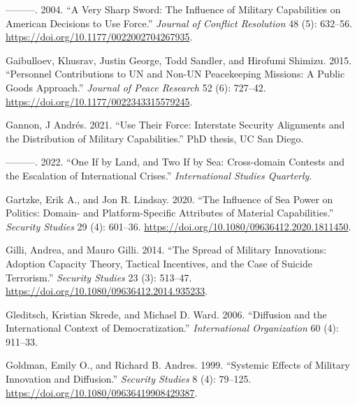\documentclass[
]{article}
\newlength{\cslhangindent}
\newlength{\cslentryspacingunit} %
\newenvironment{CSLReferences}[2] %
 {%
  \setlength{\parindent}{0pt}
  \ifodd #1
  \let\oldpar\par
  \def\par{\hangindent=\cslhangindent\oldpar}
  \fi
  \setlength{\parskip}{#2\cslentryspacingunit}
 }%
 {}
\begin{document}
\begin{CSLReferences}{1}{0}
\leavevmode{}%
---------. 2004. {``A {Very Sharp Sword}: {The Influence} of {Military Capabilities} on {American Decisions} to {Use Force}.''} \emph{Journal of Conflict Resolution} 48 (5): 632--56. \url{https://doi.org/10.1177/0022002704267935}.

\leavevmode{}%
Gaibulloev, Khusrav, Justin George, Todd Sandler, and Hirofumi Shimizu. 2015. {``Personnel Contributions to {UN} and Non-{UN} Peacekeeping Missions: {A} Public Goods Approach.''} \emph{Journal of Peace Research} 52 (6): 727--42. \url{https://doi.org/10.1177/0022343315579245}.

\leavevmode{}%
Gannon, J Andrés. 2021. {``Use {Their Force}: {Interstate Security Alignments} and the {Distribution} of {Military Capabilities}.''} PhD thesis, UC San Diego.

\leavevmode{}%
---------. 2022. {``One If by Land, and Two If by Sea: {Cross-domain} Contests and the Escalation of International Crises.''} \emph{International Studies Quarterly}.

\leavevmode{}%
Gartzke, Erik A., and Jon R. Lindsay. 2020. {``The {Influence} of {Sea Power} on {Politics}: {Domain-} and {Platform-Specific Attributes} of {Material Capabilities}.''} \emph{Security Studies} 29 (4): 601--36. \url{https://doi.org/10.1080/09636412.2020.1811450}.

\leavevmode{}%
Gilli, Andrea, and Mauro Gilli. 2014. {``The {Spread} of {Military Innovations}: {Adoption Capacity Theory}, {Tactical Incentives}, and the {Case} of {Suicide Terrorism}.''} \emph{Security Studies} 23 (3): 513--47. \url{https://doi.org/10.1080/09636412.2014.935233}.

\leavevmode{}%
Gleditsch, Kristian Skrede, and Michael D. Ward. 2006. {``Diffusion and the {International Context} of {Democratization}.''} \emph{International Organization} 60 (4): 911--33.

\leavevmode{}%
Goldman, Emily O., and Richard B. Andres. 1999. {``Systemic Effects of Military Innovation and Diffusion.''} \emph{Security Studies} 8 (4): 79--125. \url{https://doi.org/10.1080/09636419908429387}.


\end{CSLReferences}
\end{document}
